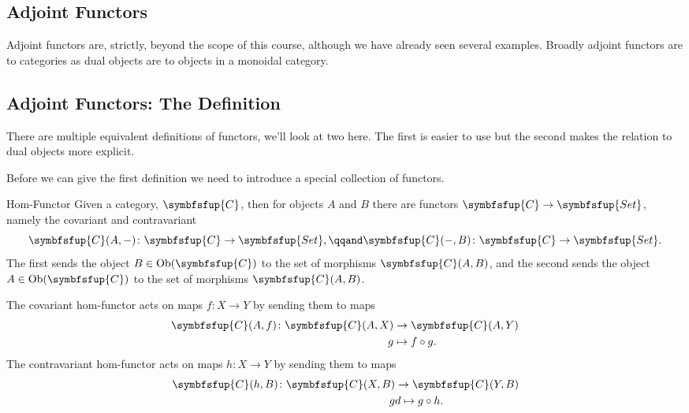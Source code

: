 \documentclass[fleqn]{NotesClass}
\makeatletter
\newcommand{\cat}[1]{\symbfsfup{#1}}
\newcommand{\c@egory}[1]{\symbfsfup{#1}}
\newcommand{\Set}{\c@egory{Set}}
\DeclareMathOperator{\Ob}{Ob}
\makeatother
\begin{document}
    \appendixpage
    \begin{appendices}
        
        \chapter{Adjoint Functors}
        Adjoint functors are, strictly, beyond the scope of this course, although we have already seen several examples.
        Broadly adjoint functors are to categories as dual objects are to objects in a monoidal category.
        
        \section{Adjoint Functors: The Definition}
        There are multiple equivalent definitions of functors, we'll look at two here.
        The first is easier to use but the second makes the relation to dual objects more explicit.
        
        Before we can give the first definition we need to introduce a special collection of functors.
        \begin{dfn}{Hom-Functor}{}
            Given a category, \(\cat{C}\), then for objects \(A\) and \(B\) there are functors \(\cat{C} \to \Set\), namely the covariant and contravariant 
            \begin{equation}
                \cat{C}(A, -) \colon \cat{C} \to \Set, \qqand \cat{C}(-, B) \colon \cat{C} \to \Set.
            \end{equation}
            The first sends the object \(B \in \Ob(\cat{C})\) to the set of morphisms \(\cat{C}(A, B)\), and the second sends the object \(A \in \Ob(\cat{C})\) to the set of morphisms \(\cat{C}(A, B)\).
            
            The covariant hom-functor acts on maps \(f \colon X \to Y\) by sending them to maps
            \begin{align}
                \cat{C}(A, f) \colon \cat{C}(A, X) &\to \cat{C}(A, Y)\\
                g &\mapsto f\circ g.
            \end{align}
            The contravariant hom-functor acts on maps \(h \colon X \to Y\) by sending them to maps
            \begin{align}
                \cat{C}(h, B) \colon \cat{C}(X, B) &\to \cat{C}(Y, B)\\
                g &d\mapsto g \circ h.
            \end{align}
        \end{dfn}
        

\end{appendices}
\end{document}
